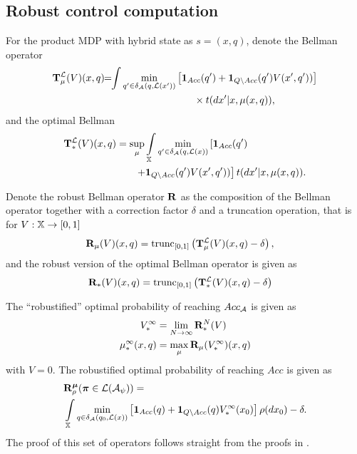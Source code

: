 \documentclass{ifacconf}
\newcommand{\red}[1]{{\color{red} #1}}
\begin{document}
\subsection{Robust control computation}

\red{For the product MDP with hybrid state as $s=(x, q)$, denote the Bellman operator}
\begin{align}\label{eq:V_recopt_inf}
& \Bel_\pol^\Labset (V)(x,q) \!\!=\!\!\int%
\min_{q' \in \delta_\FSA(q, \Labset( x'))}\left[\mathbf 1_{Acc}(q')+  \mathbf 1_{Q\setminus Acc}(q')V( x',q'))\right]\notag\\&\hspace{5cm}\hfill \times{\tr}(d x'|x,\pol(x,q)),
\end{align}
and the optimal Bellman 
\begin{align}\label{eq:V_recopt_inf}
& \Bel_\ast^\Labset (V)(x,q) =\sup_\pol\int_{\X}\min_{ q' \in \delta_\FSA(q, \Labset(\bar x))}\left[\mathbf 1_{Acc}( q')\right.\hspace{1.5cm}\\&\left.\hspace{2.5cm}+  \mathbf 1_{Q\setminus Acc}( q')V( x', q'))\right]\notag {\tr}(d x'
|x,\pol(x,q)).
\end{align}



Denote the robust Bellman operator ${\mathbf {R}}$ as the composition of the Bellman operator together with a correction factor $\delta$ and  a truncation operation, that is for $V:{\mathbb{X}}\rightarrow [0,1]$
\begin{align}\label{eq:V_recopt_inf}
& {\mathbf {R}}_{\mu} (V)(x,q) = \mathop{\mathrm{trunc}}\nolimits_{[0,1]}\left({\mathbf {T}}_{\mu}^{\mathcal{L}} (V)(x,q)-\delta\right),
\end{align}
and the robust version of the optimal Bellman operator is given as 
\begin{align}\label{eq:V_recopt_inf}
& {\mathbf {R}}_\ast (V)(x,q)= \mathop{\mathrm{trunc}}\nolimits_{[0,1]}\left({\mathbf {T}}_\ast^{\mathcal{L}} (V)(x,q)-\delta\right)
\end{align}


The ``robustified'' optimal probability of reaching $Acc_{\mathcal{A}}$ is given as
\begin{align}
	V^\infty_\ast & =\lim_{N\rightarrow \infty}{\mathbf {R}}_\ast^N (V) \\
	{\mu}^\infty_\ast(x,q)  &= \max_{\mu} {\mathbf {R}}_{\mu} (V_\ast^\infty)(x,q) 
\end{align}
with $V=0$.
The robustified optimal probability of reaching $Acc$ is given as
\begin{align}
&\BelR_\init^\polb
(\word \in\mathcal L(\mathcal A_\psi))=\\ & \int_{\X}\min_{\bar q \in \delta_\FSA(q_0,\Labset(\bar x))}\left[\mathbf 1_{Acc}(\bar q)+ \mathbf 1_{Q \setminus Acc}(\bar q) V^\infty_\ast(x_0) \right]%
\init (d x_0)-\delta.
\end{align} 
The proof of this set of operators follows straight from the proofs in \citep{tech_report_TACAS}.
 
\end{document}
